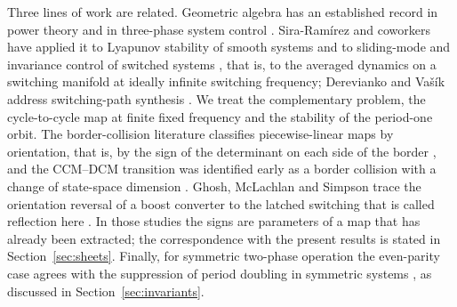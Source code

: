 \documentclass[journal]{IEEEtran}
\begin{document}
Three lines of work are related. Geometric algebra has an established record
in power theory \cite{montoya_gapot1,montoya_gapot3} and in
three-phase system control \cite{velasco2025introducing}.
Sira-Ram\'irez and coworkers have applied it to Lyapunov stability of smooth
systems \cite{sira2022lyapunov} and to sliding-mode and invariance control of
switched systems \cite{sira2023sliding,sira2023invariance,sira2025hamiltonian},
that is, to the averaged dynamics on a switching manifold at ideally infinite
switching frequency; Derevianko and Va\v{s}\'ik address switching-path
synthesis \cite{derevianko2024solverfree}. We treat the complementary
problem, the cycle-to-cycle map at finite fixed frequency and the stability of
the period-one orbit. The border-collision literature classifies
piecewise-linear maps by orientation, that is, by the sign of the determinant
on each side of the border
\cite{ghosh2025robust,simpson2025zero,fatoyinbo2023synopsis}, and the
CCM--DCM transition was identified early as a border collision with a change
of state-space dimension \cite{parui2002border}. Ghosh, McLachlan and Simpson
trace the orientation reversal of a boost converter to the latched switching
that is called reflection here \cite{ghosh2025robust}. In those studies the
signs are parameters of a map that has already been extracted; the
correspondence with the present results is stated in
Section~\ref{sec:sheets}. Finally, for symmetric two-phase operation the
even-parity case agrees with the suppression of period doubling in symmetric
systems \cite{swift1984suppression}, as discussed in
Section~\ref{sec:invariants}.
\end{document}
